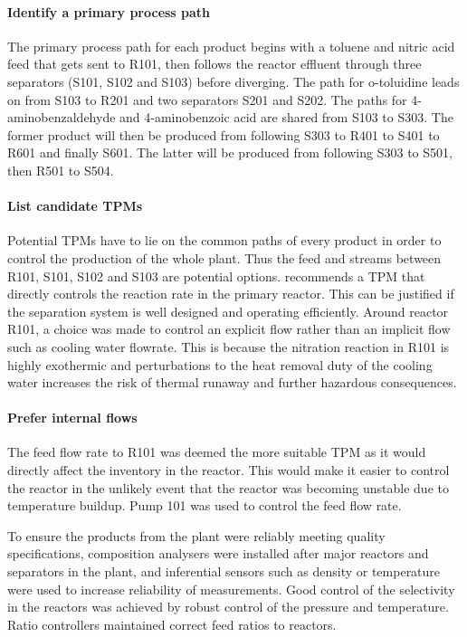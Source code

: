 \paragraph{Identify a primary process path}
The primary process path for each product begins with a toluene and nitric acid feed that gets sent to R101, then follows the reactor effluent through three separators (S101, S102 and S103) before diverging. The path for o-toluidine leads on from S103 to R201 and two separators S201 and S202. The paths for 4-aminobenzaldehyde and 4-aminobenzoic acid are shared from S103 to S303. The former product will then be produced from following S303 to R401 to S401 to R601 and finally S601. The latter will be produced from following S303 to S501, then R501 to S504.  

\paragraph{List candidate TPMs}
Potential TPMs have to lie on the common paths of every product in order to control the production of the whole plant. Thus the feed and streams between R101, S101, S102 and S103 are potential options. \textcite{} recommends a TPM that directly controls the reaction rate in the primary reactor. This can be justified if the separation system is well designed and operating efficiently. Around reactor R101, a choice was made to control an explicit flow rather than an implicit flow such as cooling water flowrate. This is because the nitration reaction in R101 is highly exothermic and perturbations to the heat removal duty of the cooling water increases the risk of thermal runaway and further hazardous consequences. 

\paragraph{Prefer internal flows}
The feed flow rate to R101 was deemed the more suitable TPM as it would directly affect the inventory in the reactor. This would make it easier to control the reactor in the unlikely event that the reactor was becoming unstable due to temperature buildup. Pump 101 was used to control the feed flow rate.

To ensure the products from the plant were reliably meeting quality specifications, composition analysers were installed after major reactors and separators in the plant, and inferential sensors such as density or temperature were used to increase reliability of measurements. Good control of the selectivity in the reactors was achieved by robust control of the pressure and temperature. Ratio controllers maintained correct feed ratios to reactors.

